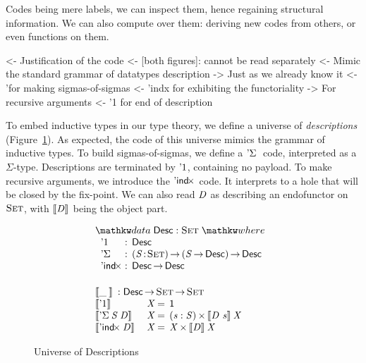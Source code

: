 Codes being mere labels, we can inspect them, hence regaining
structural information. We can also compute over them: deriving new
codes from others, or even functions on them.

\begin{wstructure}
<- Justification of the code 
    <- [both figures]: cannot be read separately
    <- Mimic the standard grammar of datatypes description
        -> Just as we already know it
        <- '\Sigma for making sigmas-of-sigmas
        <- 'indx for exhibiting the functoriality
            -> For recursive arguments
        <- '1 for end of description
\end{wstructure}

To embed inductive types in our type theory, we define a universe of
\emph{descriptions} (Figure~\ref{fig:desc_universe}). As expected, the
code of this universe mimics the grammar of inductive types. To build
sigmas-of-sigmas, we define a $\DSigma{\!}{}$ code, interpreted as a
$\Sigma$-type. Descriptions are terminated by $\DUnit$, containing no
payload. To make recursive arguments, we introduce the $\DIndx{\!}$
code. It interprets to a hole that will be closed by the fix-point. We
can also read $\V{D}$ as describing an endofunctor on $\Set$, with
$\descop{\V{D}}{\!}$ being the object part.

\begin{figure}

\[\stk{
\begin{array}{ll}
\stk{
\data \Desc : \Set \where \\
\;\;\begin{array}{@{}l@{\::\:\:}l@{\quad}l}
    \DUnit          & \Desc \\
    \DSigma{\!}{\!} & \PI{\V{S}}{\Set} \PIS{\V{S} \To \Desc} \Desc \\
    \DIndx{\!}      & \Desc \To \Desc
\end{array}
}
\vspace{0.2in}
\\
\stk{
\descop{\_\:}{} : \Desc \To \Set \To \Set \\
\begin{array}{@{}ll@{\:=\:\:}ll}
\descop{\DUnit}{& \V{X}}        &  \Unit                                       \\
\descop{\DSigma{\V{S}}{\V{D}}}{& \V{X}} &  \SIGMAS{\V{s} : \V{S}}{\descop{\V{D}~\V{s}}{\V{X}}}         \\
\descop{\DIndx{\V{D}}}{& \V{X}}     &  \TIMES{\V{X}}{\descop{\V{D}}{\V{X}}}
\end{array}
}
\end{array}
}\]


\caption{Universe of Descriptions}
\label{fig:desc_universe}

\end{figure}

